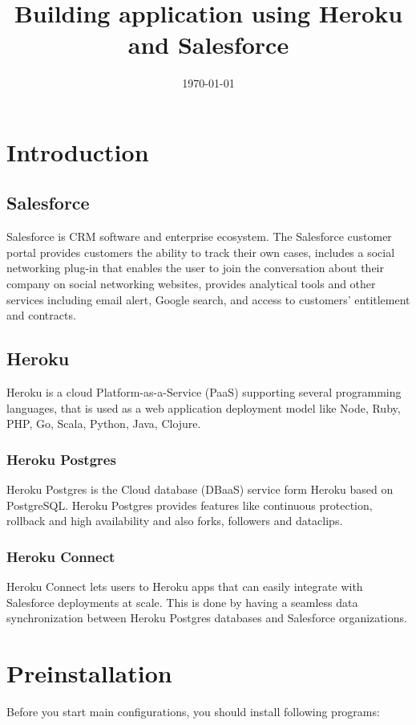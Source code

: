 \documentclass[12pt,a4paper]{article}
\begin{document}
\title{Building application using Heroku and Salesforce}
\date{\today}

\maketitle
\newpage
\tableofcontents
\newpage

\section{Introduction}
\subsection{Salesforce}
Salesforce is CRM software and enterprise ecosystem. The Salesforce customer portal provides customers the ability to track their own cases, includes a social networking plug-in that enables the user to join the conversation about their company on social networking websites, provides analytical tools and other services including email alert, Google search, and access to customers' entitlement and contracts.\cite{cos}
\subsection{Heroku}
Heroku is a cloud Platform-as-a-Service (PaaS) supporting several programming languages, that is used as a web application deployment model like Node, Ruby, PHP, Go, Scala, Python, Java, Clojure. \cite{wiki}
\subsubsection{Heroku Postgres}
Heroku Postgres is the Cloud database (DBaaS) service form Heroku based on PostgreSQL. Heroku Postgres provides features like continuous protection, rollback and high availability and also forks, followers and dataclips.\cite{wiki}
\subsubsection{Heroku Connect}
Heroku Connect lets users to Heroku apps that can easily integrate with Salesforce deployments at scale. This is done by having a seamless data synchronization between Heroku Postgres databases and Salesforce organizations.\cite{wiki}
\section{Preinstallation}
Before you start main configurations, you should install following programs:
\end{document}
